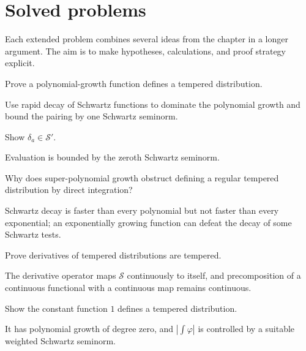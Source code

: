 \section{Solved problems}
Each extended problem combines several ideas from the chapter in a longer argument. The aim is to make hypotheses, calculations, and proof strategy explicit.

\begin{problem}\label{prob:iii18-problem-01}
Prove a polynomial-growth function defines a tempered distribution.
\end{problem}
\begin{solution}
Use rapid decay of Schwartz functions to dominate the polynomial growth and
bound the pairing by one Schwartz seminorm.
\end{solution}

\begin{problem}\label{prob:iii18-problem-02}
Show \(\delta_a\in\mathcal S'\).
\end{problem}
\begin{solution}
Evaluation is bounded by the zeroth Schwartz seminorm.
\end{solution}

\begin{problem}\label{prob:iii18-problem-03}
Why does super-polynomial growth obstruct defining a regular tempered distribution by direct integration?
\end{problem}
\begin{solution}
Schwartz decay is faster than every polynomial but not faster than every
exponential; an exponentially growing function can defeat the decay of some
Schwartz tests.
\end{solution}

\begin{problem}\label{prob:iii18-problem-04}
Prove derivatives of tempered distributions are tempered.
\end{problem}
\begin{solution}
The derivative operator maps \(\mathcal S\) continuously to itself, and
precomposition of a continuous functional with a continuous map remains
continuous.
\end{solution}

\begin{problem}\label{prob:iii18-problem-05}
Show the constant function \(1\) defines a tempered distribution.
\end{problem}
\begin{solution}
It has polynomial growth of degree zero, and
\(|\int\varphi|\) is controlled by a suitable weighted Schwartz seminorm.
\end{solution}

